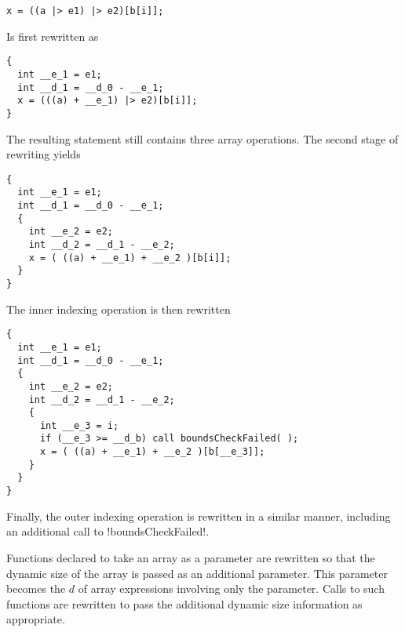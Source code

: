 \singlespace
\vspace{1.0ex}
\begin{lstlisting}[language=nesC]
x = ((a |> e1) |> e2)[b[i]];
\end{lstlisting}
\vspace{1.0ex}
\primaryspacing

Is first rewritten as

\singlespace
\vspace{1.0ex}
\begin{lstlisting}[language=nesC]
{
  int __e_1 = e1;
  int __d_1 = __d_0 - __e_1;
  x = (((a) + __e_1) |> e2)[b[i]];
}
\end{lstlisting}
\vspace{1.0ex}
\primaryspacing

The resulting statement still contains three array operations. The second stage of rewriting
yields

\singlespace
\vspace{1.0ex}
\begin{lstlisting}[language=nesC]
{
  int __e_1 = e1;
  int __d_1 = __d_0 - __e_1;
  {
    int __e_2 = e2;
    int __d_2 = __d_1 - __e_2;
    x = ( ((a) + __e_1) + __e_2 )[b[i]];
  }
}
\end{lstlisting}
\vspace{1.0ex}
\primaryspacing

The inner indexing operation is then rewritten

\singlespace
\vspace{1.0ex}
\begin{lstlisting}[language=nesC]
{
  int __e_1 = e1;
  int __d_1 = __d_0 - __e_1;
  {
    int __e_2 = e2;
    int __d_2 = __d_1 - __e_2;
    {
      int __e_3 = i;
      if (__e_3 >= __d_b) call boundsCheckFailed( );
      x = ( ((a) + __e_1) + __e_2 )[b[__e_3]];
    }
  }
}
\end{lstlisting}
\vspace{1.0ex}
\primaryspacing

Finally, the outer indexing operation is rewritten in a similar manner, including an additional
call to !boundsCheckFailed!.


Functions declared to take an array as a parameter are rewritten so that the dynamic size of the
array is passed as an additional parameter. This parameter becomes the $d$ of array expressions
involving only the parameter. Calls to such functions are rewritten to pass the additional
dynamic size information as appropriate.

